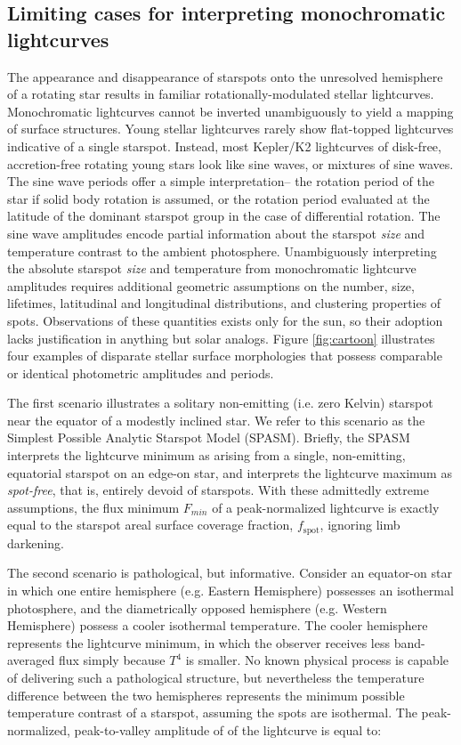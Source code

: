 \documentclass[revtex4]{emulateapj}%
\begin{document}
\subsection{Limiting cases for interpreting monochromatic lightcurves}
The appearance and disappearance of starspots onto the unresolved hemisphere of a rotating star results in familiar rotationally-modulated stellar lightcurves.  Monochromatic lightcurves cannot be inverted unambiguously to yield a mapping of surface structures.  Young stellar lightcurves rarely show flat-topped lightcurves indicative of a single starspot.  Instead, most Kepler/K2 lightcurves of disk-free, accretion-free rotating young stars look like sine waves, or mixtures of sine waves.  The sine wave periods offer a simple interpretation-- the rotation period of the star if solid body rotation is assumed, or the rotation period evaluated at the latitude of the dominant starspot group in the case of differential rotation.  The sine wave amplitudes encode partial information about the starspot \emph{size} and temperature contrast to the ambient photosphere.  Unambiguously interpreting the absolute starspot \emph{size} and temperature from monochromatic lightcurve amplitudes requires additional geometric assumptions on the number, size, lifetimes, latitudinal and longitudinal distributions, and clustering properties of spots.  Observations of these quantities exists only for the sun, so their adoption lacks justification in anything but solar analogs.  Figure \ref{fig:cartoon} illustrates four examples of disparate stellar surface morphologies that possess comparable or identical photometric amplitudes and periods.

The first scenario illustrates a solitary non-emitting (i.e. zero Kelvin) starspot near the equator of a modestly inclined star.  We refer to this scenario as the Simplest Possible Analytic Starspot Model (SPASM).  Briefly, the SPASM interprets the lightcurve minimum as arising from a single, non-emitting, equatorial starspot on an edge-on star, and interprets the lightcurve maximum as \emph{spot-free}, that is, entirely devoid of starspots.  With these admittedly extreme assumptions, the flux minimum $F_{min}$ of a peak-normalized lightcurve is exactly equal to the starspot areal surface coverage fraction, $f_{\mathrm{spot}}$, ignoring limb darkening.

The second scenario is pathological, but informative.  Consider an equator-on star in which one entire hemisphere (e.g. Eastern Hemisphere) possesses an isothermal photosphere, and the diametrically opposed hemisphere (e.g. Western Hemisphere) possess a cooler isothermal temperature.  The cooler hemisphere represents the lightcurve minimum, in which the observer receives less band-averaged flux simply because $T^4$ is smaller.  No known physical process is capable of delivering such a pathological structure, but nevertheless the temperature difference between the two hemispheres represents the minimum possible temperature contrast of a starspot, assuming the spots are isothermal.  The peak-normalized, peak-to-valley amplitude of of the lightcurve is equal to:
\end{document}
